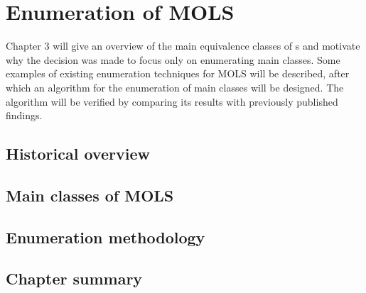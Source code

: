 \chapter{Enumeration of MOLS}
\vspace{-2em}
\minitoc

Chapter 3 will give an overview of the main equivalence classes of \lat s and motivate why the decision was made to focus only on enumerating main classes. Some examples of existing enumeration techniques for MOLS will be described, after which an algorithm for the enumeration of main classes will be designed.  The algorithm will be verified by comparing its results with previously published findings.

\section{Historical overview}

\section{Main classes of MOLS}

\section{Enumeration methodology}

\section{Chapter summary}